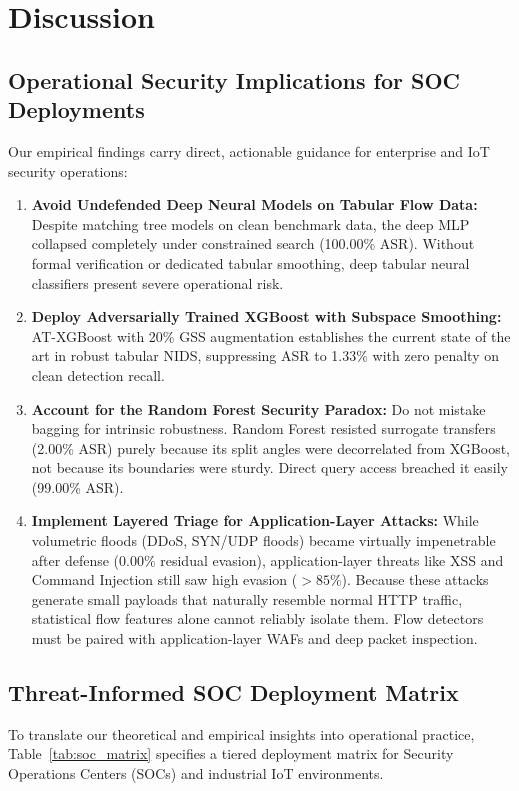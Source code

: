 \documentclass[final,5p,times,twocolumn]{elsarticle}
\begin{document}
\section{Discussion}
\label{sec:discussion}

\subsection{Operational Security Implications for SOC Deployments}
Our empirical findings carry direct, actionable guidance for enterprise and IoT security operations:
\begin{enumerate}
    \item \textbf{Avoid Undefended Deep Neural Models on Tabular Flow Data:} Despite matching tree models on clean benchmark data, the deep MLP collapsed completely under constrained search (100.00\% ASR). Without formal verification or dedicated tabular smoothing, deep tabular neural classifiers present severe operational risk.
    \item \textbf{Deploy Adversarially Trained XGBoost with Subspace Smoothing:} AT-XGBoost with 20\% GSS augmentation establishes the current state of the art in robust tabular NIDS, suppressing ASR to 1.33\% with zero penalty on clean detection recall.
    \item \textbf{Account for the Random Forest Security Paradox:} Do not mistake bagging for intrinsic robustness. Random Forest resisted surrogate transfers (2.00\% ASR) purely because its split angles were decorrelated from XGBoost, not because its boundaries were sturdy. Direct query access breached it easily (99.00\% ASR).
    \item \textbf{Implement Layered Triage for Application-Layer Attacks:} While volumetric floods (DDoS, SYN/UDP floods) became virtually impenetrable after defense (0.00\% residual evasion), application-layer threats like XSS and Command Injection still saw high evasion ($>85\%$). Because these attacks generate small payloads that naturally resemble normal HTTP traffic, statistical flow features alone cannot reliably isolate them. Flow detectors must be paired with application-layer WAFs and deep packet inspection.
\end{enumerate}

\subsection{Threat-Informed SOC Deployment Matrix}
To translate our theoretical and empirical insights into operational practice, Table~\ref{tab:soc_matrix} specifies a tiered deployment matrix for Security Operations Centers (SOCs) and industrial IoT environments.
\end{document}
